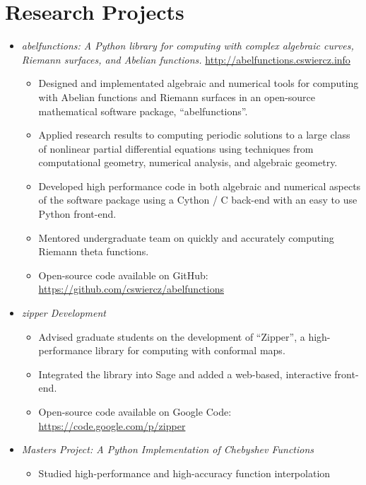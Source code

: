 \documentclass{article}
\begin{document}
\section*{Research Projects}



\begin{itemize}
  \item {\it {\sc abelfunctions}: A Python library for computing with
    complex algebraic curves, Riemann surfaces, and Abelian functions.}
    \url{http://abelfunctions.cswiercz.info}
    \begin{itemize}
    \item Designed and implementated algebraic and numerical tools for computing
      with Abelian functions and Riemann surfaces in an open-source mathematical
      software package, ``abelfunctions''.
    \item Applied research results to computing periodic solutions to a large
      class of nonlinear partial differential equations using techniques from
      computational geometry, numerical analysis, and algebraic geometry.
    \item Developed high performance code in both algebraic and numerical
      aspects of the software package using a Cython / C back-end with an easy
      to use Python front-end.
    \item Mentored undergraduate team on quickly and accurately computing
      Riemann theta functions.
    \item Open-source code available on GitHub:
      \url{https://github.com/cswiercz/abelfunctions}
    \end{itemize}
  \item {\it {\sc zipper} Development}
    \begin{itemize}
    \item Advised graduate students on the development of ``Zipper'', a
      high-performance library for computing with conformal maps.
    \item Integrated the library into Sage and added a web-based, interactive
      front-end.
    \item Open-source code available on Google Code:
      \url{https://code.google.com/p/zipper}
    \end{itemize}
  \item {\it Masters Project: A Python Implementation of Chebyshev
    Functions}
    \begin{itemize}
    \item Studied high-performance and high-accuracy function interpolation

\end{itemize}
\end{itemize}
\end{document}
